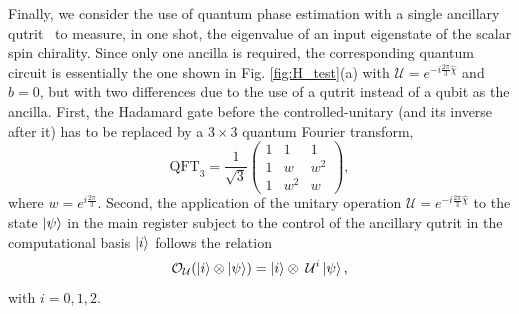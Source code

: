 \documentclass[aps,prl,twocolumn]{revtex4}
\begin{document}
Finally, we consider the use of quantum phase estimation with a single ancillary qutrit~\cite{tonchev16} to measure, in one shot, the eigenvalue of an input eigenstate of the scalar spin chirality. Since only one ancilla is required, the corresponding quantum circuit is essentially the one shown in Fig. \ref{fig:H_test}(a) with $\mathcal{U} = e^{-i \frac{2\pi}{3} \hat{\chi}}$ and $b = 0$, but with two differences due to the use of a qutrit instead of a qubit as the ancilla. First, the Hadamard gate before the controlled-unitary (and its inverse after it) has to be replaced by a $3 \times 3$ quantum Fourier transform,
\begin{equation}
    \textrm{QFT}_3 = \frac{1}{\sqrt{3}} \begin{pmatrix}
     1 & 1 & 1 \\
     1 & w & w^2 \\
     1 & w^2 & w
    \end{pmatrix},
\end{equation}
where $w = e^{i \frac{2\pi}{3}}$. Second, the application of the unitary operation $\mathcal{U} = e^{-i \frac{2\pi}{3} \hat{\chi}}$ to the state $\ket{\psi}$ in the main register subject to the control of the ancillary qutrit in the computational basis $\ket{i}$ follows the relation
\begin{equation}
    \mathcal{O}_{\mathcal{U}} (\ket{i} \otimes \ket{\psi}) = \ket{i} \otimes \; \mathcal{U}^{i} \ket{\psi} ,
\end{equation}
with $i = 0, 1, 2$. %
\end{document}
